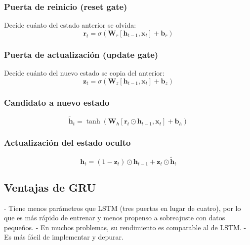 \documentclass[12pt,a4paper,openany,oneside]{book}
\begin{document}
\subsubsection{Puerta de reinicio (reset gate)}
Decide cuánto del estado anterior se olvida:
\begin{equation}
\mathbf{r}_t = \sigma( \mathbf{W}_r [\mathbf{h}_{t-1}, \mathbf{x}_t] + \mathbf{b}_r )
\end{equation}

\subsubsection{Puerta de actualización (update gate)}
Decide cuánto del nuevo estado se copia del anterior:
\begin{equation}
\mathbf{z}_t = \sigma( \mathbf{W}_z [\mathbf{h}_{t-1}, \mathbf{x}_t] + \mathbf{b}_z )
\end{equation}

\subsubsection{Candidato a nuevo estado}
\begin{equation}
\tilde{\mathbf{h}}_t = \tanh( \mathbf{W}_h [\mathbf{r}_t \odot \mathbf{h}_{t-1}, \mathbf{x}_t] + \mathbf{b}_h )
\end{equation}

\subsubsection{Actualización del estado oculto}
\begin{equation}
\mathbf{h}_t = (1 - \mathbf{z}_t) \odot \mathbf{h}_{t-1} + \mathbf{z}_t \odot \tilde{\mathbf{h}}_t
\end{equation}

\subsection{Ventajas de GRU}
- Tiene menos parámetros que LSTM (tres puertas en lugar de cuatro), por lo que es más rápido de entrenar y menos propenso a sobreajuste con datos pequeños.
- En muchos problemas, su rendimiento es comparable al de LSTM.
- Es más fácil de implementar y depurar.
\end{document}
